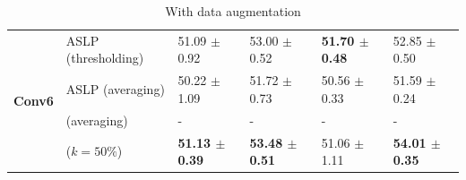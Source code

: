 \begin{table}[htbp]
\begin{subtable}[t]{\textwidth}
{\begin{tabular}{llllll}
        \multirow{4}{*}{\textbf{Conv6}} & \ac{ASLP} (thresholding)                              & 51.09 $\pm$ 0.92          & 53.00 $\pm$ 0.52          & \textbf{51.70 $\pm$ 0.48} & 52.85 $\pm$ 0.50          \\
                                        & \ac{ASLP} (averaging)                                 & 50.22 $\pm$ 1.09          & 51.72 $\pm$ 0.73          & 50.56 $\pm$ 0.33          & 51.59 $\pm$ 0.24          \\
                                        & \cite{DBLP:conf/nips/ZhouLLY19} (averaging)      & -                         & -                         & -                         & -                         \\
                                        & \cite{DBLP:conf/cvpr/RamanujanWKFR20} ($k=50\%$) & \textbf{51.13 $\pm$ 0.39} & \textbf{53.48 $\pm$ 0.51} & 51.06 $\pm$ 1.11          & \textbf{54.01 $\pm$ 0.35} \\
        \bottomrule
      \end{tabular}
    }
    \caption{With data augmentation}
  \end{subtable}

  \bigskip

  \begin{subtable}[t]{\textwidth}
    \centering
\end{subtable}
\end{table}
